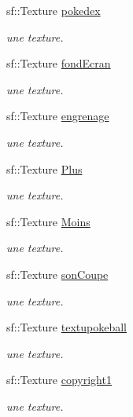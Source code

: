 \begin{DoxyCompactItemize}
sf\+::\+Texture \hyperlink{class_s_f_m_l_menu_ad6bb0f0d93ca61028496aa8b76b494fc}{pokedex}
\begin{DoxyCompactList}\small\item\em une texture. \end{DoxyCompactList}\item 
sf\+::\+Texture \hyperlink{class_s_f_m_l_menu_a44a555c22f2436a44382767da74d91b5}{fond\+Ecran}
\begin{DoxyCompactList}\small\item\em une texture. \end{DoxyCompactList}\item 
sf\+::\+Texture \hyperlink{class_s_f_m_l_menu_a9df23c060560acd7dac332112752324a}{engrenage}
\begin{DoxyCompactList}\small\item\em une texture. \end{DoxyCompactList}\item 
sf\+::\+Texture \hyperlink{class_s_f_m_l_menu_a0cb141bd4796d85ec64d36dcc5a76a12}{Plus}
\begin{DoxyCompactList}\small\item\em une texture. \end{DoxyCompactList}\item 
sf\+::\+Texture \hyperlink{class_s_f_m_l_menu_aae5b7c3d69f351ab38ec95b3c55705d2}{Moins}
\begin{DoxyCompactList}\small\item\em une texture. \end{DoxyCompactList}\item 
sf\+::\+Texture \hyperlink{class_s_f_m_l_menu_a2cf9080268fe86cd010822db2bb33cd8}{son\+Coupe}
\begin{DoxyCompactList}\small\item\em une texture. \end{DoxyCompactList}\item 
sf\+::\+Texture \hyperlink{class_s_f_m_l_menu_a6147373e00b8118205fbcb7d8d6fd3bc}{textupokeball}
\begin{DoxyCompactList}\small\item\em une texture. \end{DoxyCompactList}\item 
sf\+::\+Texture \hyperlink{class_s_f_m_l_menu_a367d55e31607d74642668d343a16b338}{copyright1}
\begin{DoxyCompactList}\small\item\em une texture. \end{DoxyCompactList}\item 

\end{DoxyCompactItemize}

